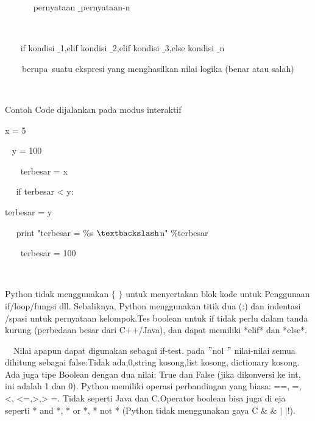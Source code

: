 \vspace{12pt}
\noindent 
~~~~~~ pernyataan $  \_  $pernyataan-n \par
\vspace{12pt}
\noindent 
~~~~~~  \par
\noindent 
~~~ if kondisi $  \_  $1,elif kondisi $  \_  $2,elif kondisi $  \_  $3,else kondisi $  \_  $n \par
\vspace{12pt}
\noindent 
~~~~berupa~suatu ekspresi yang menghasilkan nilai logika (benar atau salah)    \par
\noindent 
~~~  \par
\noindent 
Contoh Code dijalankan pada modus interaktif \par
\vspace{12pt}
\noindent 
  x = 5 \par
\vspace{12pt}
\noindent 
~ y = 100 \par
\vspace{12pt}
\noindent 
~~~ terbesar = x \par
\vspace{12pt}
\noindent 
~~ if terbesar < y: \par
\vspace{12pt}
\noindent 
terbesar = y \par
\vspace{12pt}
\noindent 
~~ print "terbesar =  $  \%  $s  $  \textbackslash  $n"  $  \%  $terbesar \par
\vspace{12pt}
\noindent 
~~~ terbesar = 100  \par
\vspace{12pt}
\noindent 
~~~  \par
\vspace{12pt}
\noindent 
 $  $Python tidak menggunakan  $  \{  $ $  \}  $ untuk menyertakan blok kode untuk Penggunaan if/loop/fungsi dll. Sebaliknya, Python menggunakan titik dua (:) dan indentasi /spasi untuk pernyataan $  $kelompok.Tes $  $boolean untuk if tidak perlu dalam tanda kurung (perbedaan besar dari C++/Java), dan dapat memiliki *elif* dan *else*. \par
\noindent 
\vspace{\baselineskip}
 $  $ $  $ $  $ $  $Nilai apapun dapat digunakan sebagai if-test. pada  $ " $nol $ " $ nilai-nilai semua dihitung sebagai false:Tidak ada,0,string kosong,list kosong, dictionary kosong. Ada juga tipe Boolean dengan dua nilai: True dan False (jika dikonversi ke int, ini adalah 1 dan 0). Python memiliki operasi perbandingan yang biasa: ==, =, <, <=,>,> =. Tidak seperti Java dan C.Operator boolean bisa juga di eja seperti * and *, * or *, * not * (Python tidak menggunakan gaya C  $  \&  $  $  \&  $  $  \vert  $  $  \vert  $!). \par
